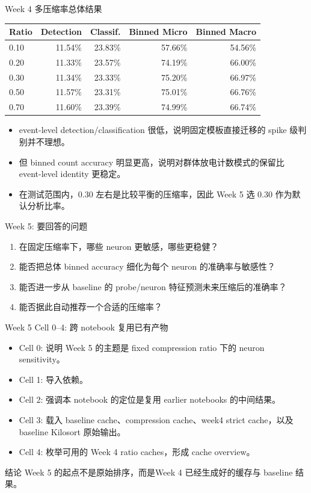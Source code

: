 \documentclass[aspectratio=169,11pt]{beamer}
\begin{document}
\begin{frame}{Week 4 多压缩率总体结果}
  \small
  \begin{tabular}{lrrrr}
    \toprule
    Ratio & Detection & Classif. & Binned Micro & Binned Macro \\
    \midrule
    0.10 & 11.54\% & 23.83\% & 57.66\% & 54.56\% \\
    0.20 & 11.33\% & 23.57\% & 74.19\% & 66.00\% \\
    0.30 & 11.34\% & 23.33\% & 75.20\% & 66.97\% \\
    0.50 & 11.57\% & 23.31\% & 75.01\% & 66.76\% \\
    0.70 & 11.60\% & 23.39\% & 74.99\% & 66.74\% \\
    \bottomrule
  \end{tabular}
  \vspace{0.6em}
  \begin{itemize}
    \item event-level detection/classification 很低，说明固定模板直接迁移的 spike 级判别并不理想。
    \item 但 binned count accuracy 明显更高，说明对群体放电计数模式的保留比 event-level identity 更稳定。
    \item 在测试范围内，0.30 左右是比较平衡的压缩率，因此 Week 5 选 0.30 作为默认分析比率。
  \end{itemize}
\end{frame}

\begin{frame}{Week 5: 要回答的问题}
  \begin{enumerate}
    \item 在固定压缩率下，哪些 neuron 更敏感，哪些更稳健？
    \item 能否把总体 binned accuracy 细化为每个 neuron 的准确率与敏感性？
    \item 能否进一步从 baseline 的 probe/neuron 特征预测未来压缩后的准确率？
    \item 能否据此自动推荐一个合适的压缩率？
  \end{enumerate}
\end{frame}

\begin{frame}{Week 5 Cell 0--4: 跨 notebook 复用已有产物}
  \begin{itemize}
    \item Cell 0: 说明 Week 5 的主题是 fixed compression ratio 下的 neuron sensitivity。
    \item Cell 1: 导入依赖。
    \item Cell 2: 强调本 notebook 的定位是复用 earlier notebooks 的中间结果。
    \item Cell 3: 载入 baseline cache、compression cache、week4 strict cache，以及 baseline Kilosort 原始输出。
    \item Cell 4: 枚举可用的 Week 4 ratio caches，形成 cache overview。
  \end{itemize}
  \begin{block}{结论}
    Week 5 的起点不是原始排序，而是\alert{Week 4 已经生成好的缓存与 baseline 结果}。
  \end{block}
\end{frame}
\end{document}
